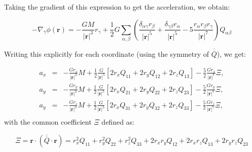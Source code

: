 \documentclass[a4paper,10pt]{article}
\newcommand{\rr}{\mathbf{r}}
\begin{document}
Taking the gradient of this expression to get the acceleration, we obtain:

\begin{equation}
 -\nabla_\gamma\phi(\rr)= -\frac{GM}{|\rr|^3} r_\gamma + 
\frac{1}{2}G\sum_{\alpha,\beta}\left(\frac{\delta_{\alpha\gamma}r_\beta}{|\rr|^5} + 
\frac{\delta_{\gamma\beta}r_\alpha}{|\rr|^5} -5\frac{r_\alpha r_\beta r_\gamma}{|\rr|^7}\right)Q_{\alpha\beta}
\end{equation}

Writing this explicitly for each coordinate (using the symmetry of $\overline{\overline{Q}}$), we get:

\begin{eqnarray}
 a_x &=& -\frac{Gr_x}{|\rr|^3}M + \frac{1}{2} \frac{G}{|\rr|^5}\left[2r_x Q_{11} + 2r_yQ_{12} + 2r_z Q_{13}\right] - 
\frac{5}{2} \frac{G r_x}{|\rr|^7} \Xi, \\
 a_y &=& -\frac{Gr_y}{|\rr|^3}M + \frac{1}{2} \frac{G}{|\rr|^5}\left[2r_x Q_{21} + 2r_yQ_{22} + 2r_z Q_{23}\right] - 
\frac{5}{2} \frac{G r_y}{|\rr|^7} \Xi, \\
 a_y &=& -\frac{Gr_z}{|\rr|^3}M + \frac{1}{2} \frac{G}{|\rr|^5}\left[2r_x Q_{31} + 2r_yQ_{32} + 2r_z Q_{33}\right] - 
\frac{5}{2} \frac{G r_z}{|\rr|^7} \Xi, \\
\end{eqnarray}
with the common coefficient $\Xi$ defined as:

\begin{equation*}
 \Xi = \rr\cdot(\overline{\overline{Q}}\cdot \rr) = r_x^2Q_{11} + r_y^2Q_{22} + r_z^2Q_{33} + 2r_xr_yQ_{12} + 
2r_xr_zQ_{13} + 2r_yr_zQ_{23}
\end{equation*}
\end{document}
